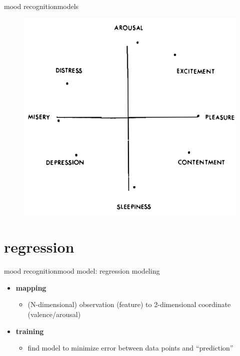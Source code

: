 \begin{frame}{mood recognition}{models}
\begin{itemize}
{\begin{figure}
                            \includegraphics[scale=.25]{graph/circumplex_affect}
                    \end{figure}
                    }
            \end{itemize}
        \end{frame}
    \section{regression}
        \begin{frame}{mood recognition}{mood model: regression modeling}
            \begin{itemize}
                \item   \textbf{mapping} 
                    \begin{itemize}
                        \item (N-dimensional) observation (feature) to 2-dimensional coordinate (valence/arousal)
                    \end{itemize}
                \bigskip
                \item   \textbf{training}
                    \begin{itemize}
                        \item find model to minimize error between data points and ``prediction''
                    \end{itemize}
            \end{itemize}
        \end{frame}
                
